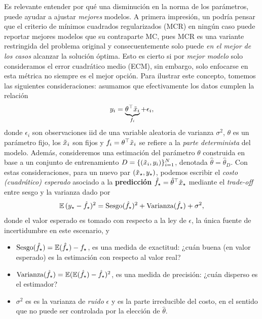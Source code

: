 Es relevante entender por qué una disminución en la norma de los parámetros, puede ayudar a ajustar \emph{mejores} modelos. A primera impresión, un podría pensar que el criterio de mínimos cuadrados regularizados (MCR) en ningún caso puede reportar mejores modelos que su contraparte MC, pues MCR es una variante restringida del problema original y consecuentemente solo puede \emph{en el mejor de los casos} alcanzar la solución óptima. Esto es cierto si por \emph{mejor modelo} solo consideramos el error cuadrático medio (ECM), sin embargo, solo enfocarse en esta métrica no siempre es el mejor opción. Para ilustrar este concepto, tomemos las siguientes consideraciones: asumamos que efectivamente los datos cumplen la relación
\begin{equation}
	y_i = \underbrace{\theta^\top\tilde{x}_i}_{f_i} + \epsilon_i,	
 \end{equation}
 donde $\epsilon_i$ son observaciones iid de una variable aleatoria de varianza $\sigma^2$, $\theta$ es un parámetro fijo, los $\tilde{x}_i$ son fijos y $f_i= \theta^\top\tilde{x}_i$ se refiere a la  \emph{parte determinista} del modelo. Además, consideremos una estimación del parámetro $\theta$ construida en base a un conjunto de entrenamiento $D=\{(\tilde{x}_i,y_i)\}_{i=1}^N$, denotada $\hat\theta=\hat\theta_D$. Con estas consideraciones, para un nuevo par $(\tilde{x}_\star,y_\star)$, podemos escribir el \emph{costo (cuadrático) esperado} asociado a la \textbf{predicción} $\hat f_\star = \hat\theta^\top \tilde{x}_\star$ mediante el \emph{trade-off} entre sesgo y la varianza \cite{ISLbook} dado por
\begin{equation}
 	\operatorname{\mathbb{E}}{(y_\star - \hat f_\star)^2} = \text{Sesgo}(\hat f_\star)^2 + \text{Varianza}(\hat f_\star) + \sigma^2,\label{eq:expected_sq_loss}
 \end{equation} 
 donde el valor esperado es tomado con respecto a la ley de $\epsilon$, la única fuente de incertidumbre en este escenario, y 
 \begin{itemize}
 	\item $\text{Sesgo}(\hat f_\star) = \operatorname{\mathbb{E}}(\hat f_\star) - f_\star$, es una medida de exactitud: ¿cuán buena (en valor esperado) es la estimación con respecto al valor real?
 	\item $\text{Varianza}(\hat f_\star)= \operatorname{\mathbb{E}}(\operatorname{\mathbb{E}}(\hat f_\star)- \hat f_\star)^2$, es una medida de precisión: ¿cuán disperso es el estimador?
 	\item $\sigma^2$ es es la varianza de \emph{ruido} $\epsilon$ y es la parte irreducible del costo, en el sentido que no puede ser controlada por la elección de $\hat\theta$.
 \end{itemize}

